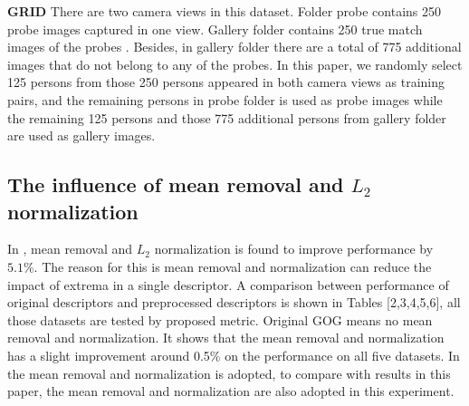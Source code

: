 \documentclass[conference,compsoc]{IEEEtran}
\begin{document}
\textbf{GRID} There are two camera views in this dataset. Folder probe contains 250 probe images captured in one view. Gallery folder contains 250 true match images of the probes . Besides, in gallery folder there are a total of 775 additional images that do not belong to any of the probes. In this paper, we randomly select 125 persons from those 250 persons appeared in both camera views as training pairs, and the remaining persons in probe folder is used as probe images while  the remaining 125 persons and those 775 additional persons from gallery folder are used as gallery images. 
\subsection{The influence of mean removal and $L_2$ normalization}
In \cite{GOG}, mean removal and $L_2$  normalization is found to improve performance by $5.1\%$. The reason for this is mean removal and normalization can reduce the impact of extrema in a single descriptor. A comparison between performance of original descriptors and preprocessed descriptors is shown in Tables [2,3,4,5,6], all those datasets are tested by proposed metric. Original GOG means no mean removal and normalization. It shows that the mean removal and normalization has a slight improvement around 0.5\% on the performance on all five datasets. In \cite{GOG} the mean removal and normalization is adopted, to compare with results in this paper, the mean removal and normalization are also adopted in this experiment. 
\end{document}
